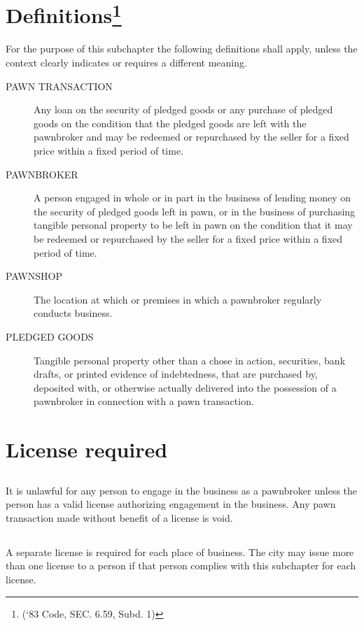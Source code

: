 \setcounter{section}{29}
\section{Definitions\footnote{(‘83 Code, SEC. 6.59, Subd. 1)}}
For the purpose of this subchapter the following definitions shall apply, unless the context clearly indicates or requires a different meaning.
\begin{description}
    \item[PAWN TRANSACTION] Any loan on the security of pledged goods or any purchase of pledged goods on the condition that the pledged goods are left with the pawnbroker and may be redeemed or repurchased by the seller for a fixed price within a fixed period of time.
    \item[PAWNBROKER] A person engaged in whole or in part in the business of lending money on the security of pledged goods left in pawn, or in the business of purchasing tangible personal property to be left in pawn on the condition that it may be redeemed or repurchased by the seller for a fixed price within a fixed period of time.
    \item[PAWNSHOP] The location at which or premises in which a pawnbroker regularly conducts business.
    \item[PLEDGED GOODS] Tangible personal property other than a chose in action, securities, bank drafts, or printed evidence of indebtedness, that are purchased by, deposited with, or otherwise actually delivered into the possession of a pawnbroker in connection with a pawn transaction.
\end{description}

\section{License required}
\subsection{}
It is unlawful for any person to engage in the business as a pawnbroker unless the person has a valid license authorizing engagement in the business. Any pawn transaction made without benefit of a license is void.
\subsection{}
A separate license is required for each place of business. The city may issue more than one license to a person if that person complies with this subchapter for each license.
